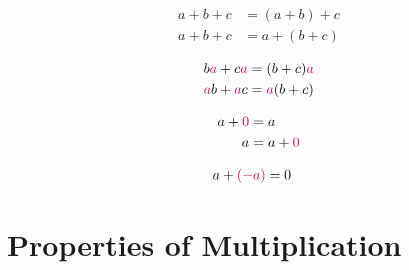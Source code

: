 \documentclass[20150903-160354-rs2.2-MarksMathNotebook.tex]{subfiles}
\begin{document}
\begin{property}
\begin{subequations}
\begin{align}
a+b+c &= (a+b)+c \label{eq:apa1} \\
a+b+c &= a+(b+c) \label{eq:apa2}
\end{align}
\end{subequations}
\end{property}

\begin{property}
\begin{subequations}
\begin{align}
b\alert{a} + c\alert{a} &= (b+c)\alert{a} \label{eq:dpf1} \\
\alert{a}b + \alert{a}c &= \alert{a}(b+c) \label{eq:dpf2}
\end{align}
\end{subequations}
\end{property}

\begin{property}
\begin{subequations}
\begin{align}
a+\alert{0} &= a \label{eq:aid1} \\
a &= a+\alert{0} \label{eq:aid2}
\end{align}
\end{subequations}
\end{property}

\begin{property}
\begin{subequations}
\begin{align}
a + \alert{(-a)} &= 0 \label{eq:ai}
\end{align}
\end{subequations}
\end{property}



\section{Properties of Multiplication}
\end{document}
